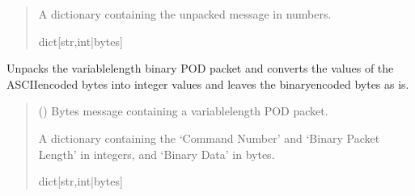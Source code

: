 \documentclass[letterpaper,10pt,english]{sphinxmanual}
\begin{document}
\begin{fulllineitems}
\begin{fulllineitems}
\begin{quote}
\begin{description}
\sphinxAtStartPar
A dictionary containing the unpacked message in numbers.

\sphinxAtStartPar
dict{[}str,int|bytes{]}

\end{description}\end{quote}

\end{fulllineitems}


\begin{fulllineitems}
\label{\detokenize{BasicPodProtocol:BasicPodProtocol.POD_Basics.TranslatePODpacket_Binary}}
\pysigstartsignatures
{}
\pysigstopsignatures
\sphinxAtStartPar
Unpacks the variable\sphinxhyphen{}length binary POD packet and converts the values of the ASCII\sphinxhyphen{}encoded
bytes into integer values and leaves the binary\sphinxhyphen{}encoded bytes as is.
\begin{quote}\begin{description}
\sphinxAtStartPar
{} () \textendash{} Bytes message containing a variable\sphinxhyphen{}length POD packet.

\sphinxAtStartPar
A dictionary containing the ‘Command Number’ and ‘Binary Packet Length’                 in integers, and ‘Binary Data’ in bytes.

\sphinxAtStartPar
dict{[}str,int|bytes{]}

\end{description}\end{quote}

\end{fulllineitems}



\end{fulllineitems}
\end{document}

